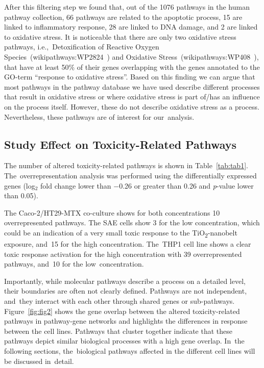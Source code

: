 \documentclass[ijms,article,accept,moreauthors,pdftex]{Definitions/mdpi}
\begin{document}
\begin{paracol}{2}
After this filtering step we found that, out of the 1076 pathways in the human pathway collection, 66 pathways are related to the apoptotic process, 15 are linked to inflammatory response, 28 are linked to DNA damage, and 2 are linked to oxidative stress.
It is noticeable that there are only two oxidative stress pathways, i.e.,~Detoxification of Reactive Oxygen Species~(wikipathways:WP2824~\cite{WP2824})
and Oxidative Stress~(wikipathways:WP408~\cite{WP408}), that have at least 50$\%$ of their genes overlapping with the genes annotated to the GO-term ``response to oxidative stress''. Based on this finding we can argue that most pathways in the pathway database we have used describe different processes that result in oxidative stress or where oxidative stress is part of/has an influence on the process itself. However, these do not describe oxidative stress as a process.  Nevertheless, these pathways are of interest for our~analysis. 

\subsection{Study Effect on Toxicity-Related Pathways}
The number of altered toxicity-related pathways is shown in Table~\ref{tab:tab1}. The~overrepresentation analysis was performed using the differentially expressed genes (log$_{2}$ fold change lower than $-$0.26 or greater than 0.26 and \emph{p}-value lower than 0.05). 

The {Caco-2/HT29-MTX co-culture} shows for both concentrations 10 overrepresented pathways. The SAE {cells} show 3 for the low concentration, which could be an indication of a very small toxic response to the TiO\textsubscript{2}-nanobelt exposure, and~15 for the high concentration. The~THP1 cell line shows a clear toxic response activation for the high concentration with 39 overrepresented pathways, and~10 for the low~concentration.



Importantly, while molecular pathways describe a process on a detailed level, their boundaries are often not clearly defined. Pathways are not independent, and~they interact with each other through shared genes or sub-pathways. Figure~\ref{fig:fig2} shows the gene overlap between the altered toxicity-related pathways in pathway-gene networks and highlights the differences in response between the cell lines. Pathways that cluster together indicate that these pathways depict similar biological processes with a high gene overlap. In~the following sections, the~biological pathways affected in the different cell lines will be discussed in~detail.





\end{paracol}
\end{document}
